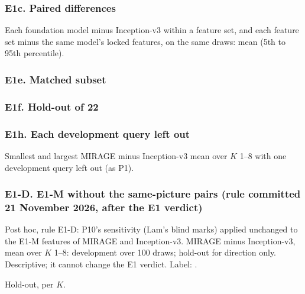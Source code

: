 \subsubsection*{E1c. Paired differences}
Each foundation model minus Inception-v3 within a feature set, and each feature set minus the same model's locked features, on the same draws: mean (5th to 95th percentile).
{\tiny\let\scriptsize\tiny\setlength{\tabcolsep}{2pt}}
\fi
{}\ifgen
\subsubsection*{E1e. Matched subset}

{\tiny\let\scriptsize\tiny\setlength{\tabcolsep}{2pt}}
\fi
{}\ifgen
\subsubsection*{E1f. Hold-out of 22}

{\tiny\let\scriptsize\tiny\setlength{\tabcolsep}{2pt}}
\fi
{}\ifgen
\subsubsection*{E1h. Each development query left out}
Smallest and largest MIRAGE minus Inception-v3 mean over $K$ 1--8 with one development query left out (as P1). 
\begin{center}\footnotesize\end{center}
\fi
{}\ifgen
\subsubsection*{E1-D. E1-M without the same-picture pairs (rule committed 21 November 2026, after the E1 verdict)}
Post hoc, rule E1-D: P10's sensitivity (Lam's blind marks) applied unchanged to the E1-M features of MIRAGE and Inception-v3. MIRAGE minus Inception-v3, mean over $K$ 1--8: development over 100 draws; hold-out for direction only. Descriptive; it cannot change the E1 verdict.  Label: .
\begin{center}\footnotesize\end{center}
Hold-out, per $K$. 
\begin{center}\footnotesize\end{center}
\fi

